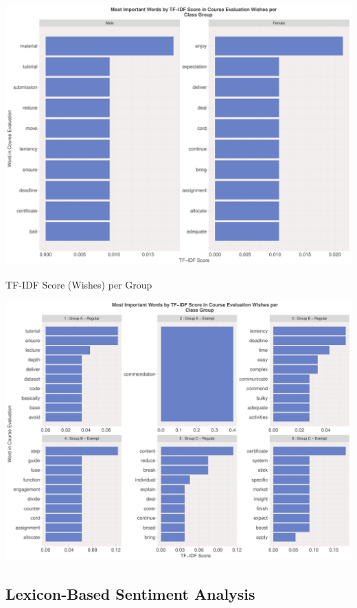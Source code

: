 \documentclass[
]{article}
\begin{document}
\includegraphics{AnalysisOfCourseEvaluation-Notebook_files/figure-latex/TF-IDFWishesPerGender-1.pdf}

\newpage

TF-IDF Score (Wishes) per Group

\includegraphics{AnalysisOfCourseEvaluation-Notebook_files/figure-latex/TF-IDFWishesPerGroup-1.pdf}

\newpage

\subsection{Lexicon-Based Sentiment
Analysis}\label{lexicon-based-sentiment-analysis}
\end{document}
